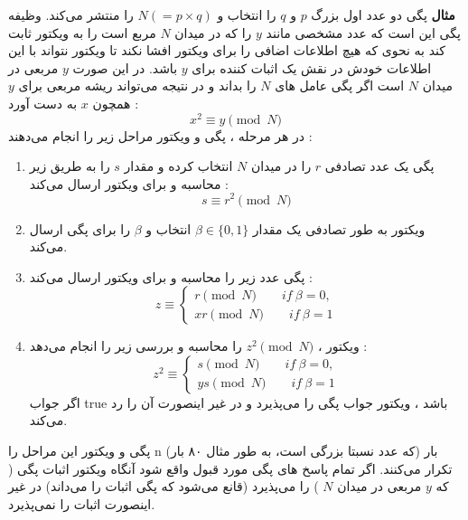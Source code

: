 \documentclass[12pt,a4paper]{article}
\begin{document}
\textbf{مثال}
پگی دو عدد اول بزرگ 
$p$
و
$q$
را انتخاب و 
$N (= p \times q)$
را منتشر می‌کند. وظیفه پگی این است که عدد مشخصی مانند
$y$
را که در میدان 
$N$
مربع است را به ویکتور ثابت کند به نحوی که هیچ اطلاعات اضافی را برای ویکتور افشا نکند تا ویکتور نتواند با این اطلاعات خودش در نقش یک اثبات کننده برای 
$y$
باشد. در این صورت 
$y$
مربعی در میدان 
$N$
است اگر پگی عامل های 
$N$
را بداند و در نتیجه می‌تواند ریشه مربعی برای
$y$
همچون 
$x$
به دست آورد :
$$ x^2 \equiv y \pmod N $$
در هر مرحله ، پگی و ویکتور مراحل زیر را انجام می‌دهند :
\begin{enumerate}
\item{
پگی یک عدد تصادفی 
$r$
را در میدان 
$N$
انتخاب کرده و مقدار
$s$
را به طریق زیر محاسبه و برای ویکتور ارسال می‌کند :
 $$ s \equiv r^2 \pmod{N} $$
	
}

\item{
ویکتور به طور تصادفی یک مقدار
$\beta \in \{0,1\}$
انتخاب و 
$\beta$
را برای پگی ارسال می‌کند.
}

\item{
پگی عدد زیر را محاسبه و برای ویکتور ارسال می‌کند :
\begin{equation}
	z \equiv 
	\begin{cases}
		r \pmod{N} \qquad if \ \beta = 0 ,\\
		xr \pmod{N} \qquad if \  \beta = 1
	\end{cases}
\end{equation}
}

\item {
ویکتور ، 
$ z^2 \pmod{N}$
را محاسبه و بررسی زیر را انجام می‌دهد :
\begin{equation}
z^2 \equiv 
\begin{cases}
s \pmod{N} \qquad if \ \beta = 0 ,\\
ys \pmod{N} \qquad if \  \beta = 1
\end{cases}
\end{equation}
اگر جواب 
true
باشد ، ویکتور جواب پگی را می‌پذیرد و در غیر اینصورت آن را رد می‌کند.

}
\end{enumerate}
پگی و ویکتور این مراحل را 
n
بار (که عدد نسبتا بزرگی است، به طور مثال ۸۰ بار) تکرار می‌کنند. اگر تمام پاسخ های پگی مورد قبول واقع شود آنگاه ویکتور اثبات پگی ( که  
$y$
 مربعی در میدان 
 $N$
 ) را می‌پذیرد (قانع می‌شود که پگی اثبات را می‌داند) در غیر اینصورت اثبات را نمی‌پذیرد.
\newline
\end{document}
